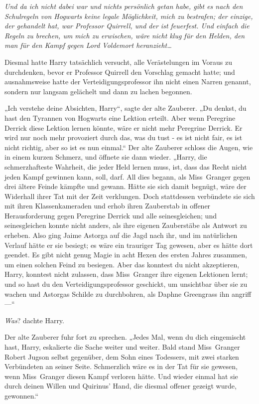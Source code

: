 {\emph{Und da ich nicht dabei war und nichts persönlich getan habe, gibt es nach den Schulregeln von Hogwarts keine legale Möglichkeit, mich zu bestrafen; der einzige, der gehandelt hat, war Professor Quirrell, und der ist feuerfest. Und einfach die Regeln zu brechen, um mich zu erwischen, wäre nicht klug für den Helden, den man für den Kampf gegen Lord Voldemort heranzieht…}

Diesmal hatte Harry tatsächlich versucht, alle Verästelungen im Voraus zu durchdenken, bevor er Professor Quirrell den Vorschlag gemacht hatte; und ausnahmsweise hatte der Verteidigungsprofessor ihn nicht einen Narren genannt, sondern nur langsam gelächelt und dann zu lachen begonnen.

„Ich verstehe deine Absichten, Harry“, sagte der alte Zauberer. „Du denkst, du hast den Tyrannen von Hogwarts eine Lektion erteilt. Aber wenn Peregrine Derrick diese Lektion lernen könnte, wäre er nicht mehr Peregrine Derrick. Er wird nur noch mehr provoziert durch das, was du tust - es ist nicht fair, es ist nicht richtig, aber so ist es nun einmal.“ Der alte Zauberer schloss die Augen, wie in einem kurzen Schmerz, und öffnete sie dann wieder. „Harry, die schmerzhafteste Wahrheit, die jeder Held lernen muss, ist, dass das Recht nicht jeden Kampf gewinnen kann, soll, darf. All dies begann, als Miss~Granger gegen drei ältere Feinde kämpfte und gewann. Hätte sie sich damit begnügt, wäre der Widerhall ihrer Tat mit der Zeit verklungen. Doch stattdessen verbündete sie sich mit ihren Klassenkameraden und erhob ihren Zauberstab in offener Herausforderung gegen Peregrine Derrick und alle seinesgleichen; und seinesgleichen konnte nicht anders, als ihre eigenen Zauberstäbe als Antwort zu erheben. Also ging Jaime Astorga auf die Jagd nach ihr, und im natürlichen Verlauf hätte er sie besiegt; es wäre ein trauriger Tag gewesen, aber es hätte dort geendet. Es gibt nicht genug Magie in acht Hexen des ersten Jahres zusammen, um einen solchen Feind zu besiegen. Aber das konntest du nicht akzeptieren, Harry, konntest nicht zulassen, dass Miss~Granger ihre eigenen Lektionen lernt; und so hast du den Verteidigungsprofessor geschickt, um unsichtbar über sie zu wachen und Astorgas Schilde zu durchbohren, als Daphne Greengrass ihn angriff—“

\emph{Was}? dachte Harry.

Der alte Zauberer fuhr fort zu sprechen. „Jedes Mal, wenn du dich eingemischt hast, Harry, eskalierte die Sache weiter und weiter. Bald stand Miss~Granger Robert Jugson selbst gegenüber, dem Sohn eines Todessers, mit zwei starken Verbündeten an seiner Seite. Schmerzlich wäre es in der Tat für sie gewesen, wenn Miss~Granger diesen Kampf verloren hätte. Und wieder einmal hat sie durch deinen Willen und Quirinus' Hand, die diesmal offener gezeigt wurde, gewonnen.“

}
